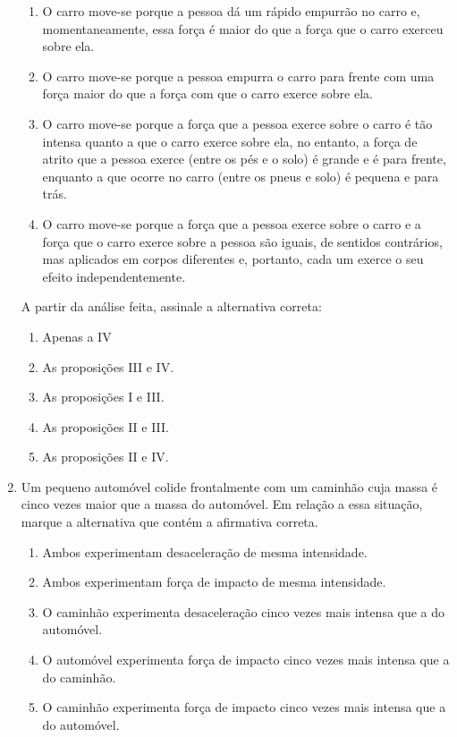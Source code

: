 \documentclass[12pt,letterpaper,fleqn]{article}
\begin{document}
\begin{enumerate}
\begin{enumerate}[I]
    \item O carro move-se porque a pessoa dá um rápido empurrão no carro e, momentaneamente, essa força é maior do que a força que o carro exerceu sobre ela.
    \item O carro move-se porque a pessoa empurra o carro para frente com uma força maior do que a força com que o carro exerce sobre ela.
    \item O carro move-se porque a força que a pessoa exerce sobre o carro é tão intensa quanto a que o carro exerce sobre ela, no entanto, a força de atrito que a pessoa exerce (entre os pés e o solo) é grande e é para frente, enquanto a que ocorre no carro (entre os pneus e solo) é pequena e para trás.
    \item O carro move-se porque a força que a pessoa exerce sobre o carro e a força que o carro exerce sobre a pessoa são iguais, de sentidos contrários, mas aplicados em corpos diferentes e, portanto, cada um exerce o seu efeito independentemente.
\end{enumerate}
A partir da análise feita, assinale a alternativa correta:
\begin{enumerate}
    \item Apenas a IV
    \item As proposições III e IV.
    \item As proposições I e III.
    \item As proposições II e III.
    \item As proposições II e IV.
\end{enumerate}
\item Um pequeno automóvel colide frontalmente com um caminhão cuja massa é cinco vezes maior que a massa do automóvel. Em relação a essa situação, marque a alternativa que contém a afirmativa correta.
\begin{enumerate}
    \item Ambos experimentam desaceleração de mesma intensidade.
    \item Ambos experimentam força de impacto de mesma intensidade.
    \item O caminhão experimenta desaceleração cinco vezes mais intensa que a do automóvel.
    \item O automóvel experimenta força de impacto cinco vezes mais intensa que a do caminhão.
    \item O caminhão experimenta força de impacto cinco vezes mais intensa que a do automóvel.
\end{enumerate}
\end{enumerate}
\newpage
\end{document}
